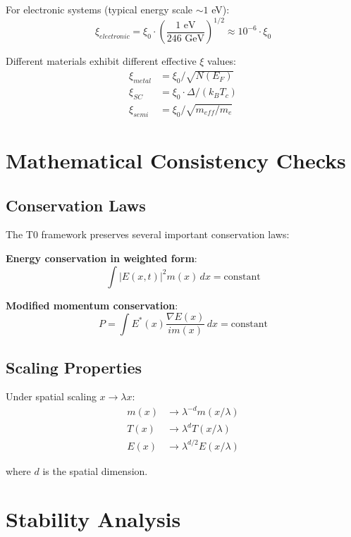 \documentclass[12pt,a4paper]{article}
\begin{document}
	For electronic systems (typical energy scale $\sim 1$ eV):
	\begin{equation}
		\xi_{electronic} = \xi_0 \cdot \left(\frac{1 \text{ eV}}{246 \text{ GeV}}\right)^{1/2} \approx 10^{-6} \cdot \xi_0
	\end{equation}
	
	Different materials exhibit different effective $\xi$ values:
	\begin{align}
		\xi_{metal} &= \xi_0 / \sqrt{N(E_F)} \\
		\xi_{SC} &= \xi_0 \cdot \Delta/(k_B T_c) \\
		\xi_{semi} &= \xi_0 / \sqrt{m_{eff}/m_e}
	\end{align}
	
	\section{Mathematical Consistency Checks}
	
	\subsection{Conservation Laws}
	
	The T0 framework preserves several important conservation laws:
	
	\textbf{Energy conservation in weighted form}:
	\begin{equation}
		\int |E(x,t)|^2 m(x) \, dx = \text{constant}
	\end{equation}
	
	\textbf{Modified momentum conservation}:
	\begin{equation}
		P = \int E^*(x) \frac{\nabla E(x)}{im(x)} \, dx = \text{constant}
	\end{equation}
	
	\subsection{Scaling Properties}
	
	Under spatial scaling $x \rightarrow \lambda x$:
	\begin{align}
		m(x) &\rightarrow \lambda^{-d} m(x/\lambda) \\
		T(x) &\rightarrow \lambda^d T(x/\lambda) \\
		E(x) &\rightarrow \lambda^{d/2} E(x/\lambda)
	\end{align}
	
	where $d$ is the spatial dimension.
	
	\section{Stability Analysis}
	
\end{document}
